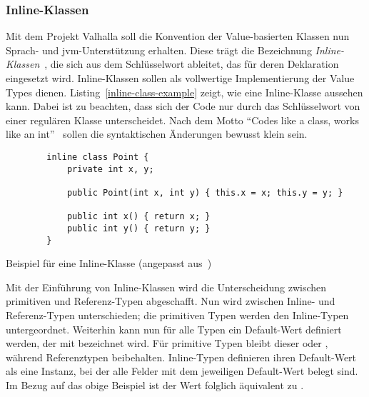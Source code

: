 \subsubsection{Inline-Klassen}

Mit dem Projekt Valhalla soll die Konvention der Value-basierten Klassen nun Sprach- und \ac{jvm}-Unterstützung erhalten.
Diese trägt die Bezeichnung \emph{Inline-Klassen}~\cite{object-model}, die sich aus dem Schlüsselwort  ableitet, das für deren Deklaration eingesetzt wird.
Inline-Klassen sollen als vollwertige Implementierung der Value Types dienen.
Listing~\ref{inline-class-example} zeigt, wie eine Inline-Klasse aussehen kann.
Dabei ist zu beachten, dass sich der Code nur durch das Schlüsselwort  von einer regulären Klasse unterscheidet.
Nach dem Motto ``Codes like a class, works like an int''~\cite{object-model} sollen die syntaktischen Änderungen bewusst klein sein.

\begin{listing}
    \begin{verbatim}
        inline class Point {
            private int x, y;

            public Point(int x, int y) { this.x = x; this.y = y; }

            public int x() { return x; }
            public int y() { return y; }
        }
    \end{verbatim}
    \vspace{-3ex}
    \caption{Beispiel für eine Inline-Klasse (angepasst aus~\cite{object-model})}
    \label{inline-class-example}
\end{listing}

Mit der Einführung von Inline-Klassen wird die Unterscheidung zwischen primitiven und Referenz-Typen abgeschafft.
Nun wird zwischen Inline- und Referenz-Typen unterschieden;
die primitiven Typen werden den Inline-Typen untergeordnet.
Weiterhin kann nun für alle Typen ein Default-Wert definiert werden, der mit  bezeichnet wird.
Für primitive Typen bleibt dieser  oder , während Referenztypen  beibehalten.
Inline-Typen definieren ihren Default-Wert als eine Instanz, bei der alle Felder mit dem jeweiligen Default-Wert belegt sind.
Im Bezug auf das obige Beispiel ist der Wert  folglich äquivalent zu .

